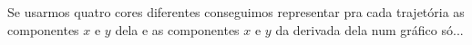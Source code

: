 \documentclass[oneside,12pt]{article}
\begin{document}
Se usarmos quatro cores diferentes conseguimos representar pra cada
trajetória as componentes $x$ e $y$ dela e as componentes $x$ e $y$ da
derivada dela num gráfico só...

\newpage


\pu

\def\trajcomponents#1{%
  \vcenter{\hbox{%
    \beginpicture(0,-2)(7,2)
    \pictgrid%
    #1%
    \pictaxes%
    \end{picture}%
  }}}

\unitlength=12pt

\end{document}
